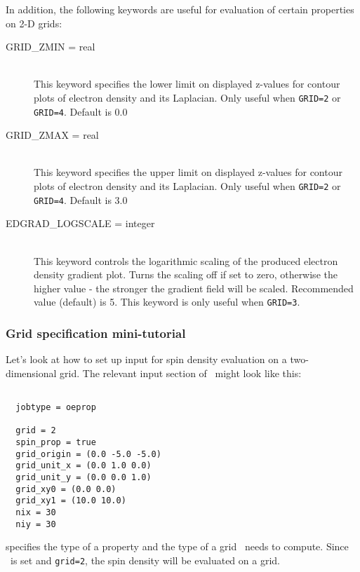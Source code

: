 In addition, the following keywords are useful for evaluation of certain
properties on 2-D grids:

\begin{description}

\item[GRID\_ZMIN = real]\mbox{}\\
This keyword specifies the lower limit on displayed
z-values for contour plots of electron density and 
its Laplacian. Only useful when {\tt GRID=2} or {\tt GRID=4}.
Default is 0.0

\item[GRID\_ZMAX = real]\mbox{}\\
This keyword specifies the upper limit on displayed
z-values for contour plots of electron density and 
its Laplacian. Only useful when {\tt GRID=2} or {\tt GRID=4}.
Default is 3.0

\item[EDGRAD\_LOGSCALE = integer]\mbox{}\\
This keyword controls the logarithmic scaling of the produced electron density gradient 
plot. Turns the scaling off if set to zero, otherwise the higher value - 
the stronger the gradient field will be scaled.
Recommended value (default) is 5. This keyword is only useful when
{\tt GRID=3}.

\end{description}

\subsubsection{Grid specification mini-tutorial}

Let's look at how to set up input for spin density evaluation on a
two-dimensional grid.  The relevant input section of \PSIthree\ might look like
this:
\begin{verbatim}

  jobtype = oeprop

  grid = 2
  spin_prop = true
  grid_origin = (0.0 -5.0 -5.0)
  grid_unit_x = (0.0 1.0 0.0)
  grid_unit_y = (0.0 0.0 1.0)
  grid_xy0 = (0.0 0.0)
  grid_xy1 = (10.0 10.0)
  nix = 30
  niy = 30

\end{verbatim}
 specifies the type of a property and the type of a grid
\PSIoeprop\ needs to compute.
Since \ is set and {\tt grid=2}, the spin density will be
evaluated on a grid.

